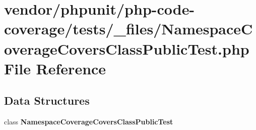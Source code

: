 \section{vendor/phpunit/php-\/code-\/coverage/tests/\+\_\+files/\+Namespace\+Coverage\+Covers\+Class\+Public\+Test.php File Reference}
\label{php-code-coverage_2tests_2__files_2_namespace_coverage_covers_class_public_test_8php}
\subsection*{Data Structures}
\begin{DoxyCompactItemize}
\item 
class {\bf Namespace\+Coverage\+Covers\+Class\+Public\+Test}
\end{DoxyCompactItemize}
